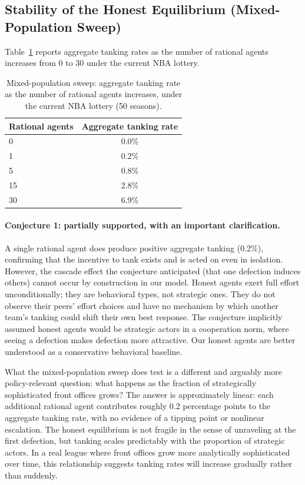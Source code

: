\documentclass{article}
\begin{document}
\subsection{Stability of the Honest Equilibrium (Mixed-Population Sweep)}

Table~\ref{tab:mixed} reports aggregate tanking rates as the number of
rational agents increases from 0 to 30 under the current NBA lottery.

\begin{table}[h]
\centering
\renewcommand{\arraystretch}{1.2}
\begin{tabular}{lc}
\toprule
\textbf{Rational agents} & \textbf{Aggregate tanking rate} \\
\midrule
0  & 0.0\% \\
1  & 0.2\% \\
5  & 0.8\% \\
15 & 2.8\% \\
30 & 6.9\% \\
\bottomrule
\end{tabular}
\caption{Mixed-population sweep: aggregate tanking rate as the number of
rational agents increases, under the current NBA lottery (50 seasons).}
\label{tab:mixed}
\end{table}

\paragraph{Conjecture 1: partially supported, with an important clarification.}
A single rational agent does produce positive aggregate tanking (0.2\%),
confirming that the incentive to tank exists and is acted on even in isolation.
However, the cascade effect the conjecture anticipated (that one defection
induces others) cannot occur by construction in our model.
Honest agents exert full effort unconditionally; they are behavioral types,
not strategic ones.
They do not observe their peers' effort choices and have no mechanism by which
another team's tanking could shift their own best response.
The conjecture implicitly assumed honest agents would be strategic actors in a
cooperation norm, where seeing a defection makes defection more attractive.
Our honest agents are better understood as a conservative behavioral baseline.

What the mixed-population sweep does test is a different and arguably more
policy-relevant question: what happens as the fraction of strategically
sophisticated front offices grows?
The answer is approximately linear: each additional rational agent contributes
roughly 0.2 percentage points to the aggregate tanking rate, with no evidence
of a tipping point or nonlinear escalation.
The honest equilibrium is not fragile in the sense of unraveling at the first
defection, but tanking scales predictably with the proportion of strategic
actors.
In a real league where front offices grow more analytically sophisticated over
time, this relationship suggests tanking rates will increase gradually rather
than suddenly.
\end{document}
